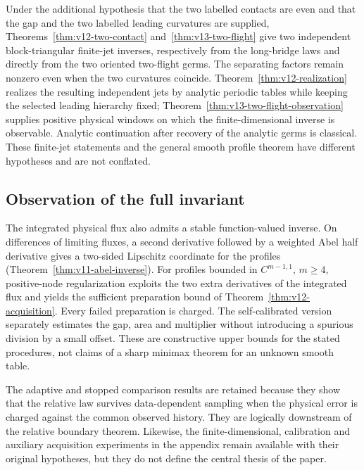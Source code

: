 Under the additional hypothesis that the two labelled contacts are
even and that the gap and the two labelled leading curvatures are supplied,
Theorems~\ref{thm:v12-two-contact} and~\ref{thm:v13-two-flight} give two
independent block-triangular finite-jet inverses, respectively from the
long-bridge laws and directly from the two oriented two-flight germs.  The
separating factors remain nonzero even when the two curvatures coincide.
Theorem~\ref{thm:v12-realization} realizes the resulting independent jets
by analytic periodic tables while keeping the selected leading hierarchy
fixed; Theorem~\ref{thm:v13-two-flight-observation} supplies positive
physical windows on which the finite-dimensional inverse is observable.
Analytic continuation after recovery of the analytic germs is classical.
These finite-jet statements and the general smooth profile theorem have
different hypotheses and are not conflated.

\subsection{Observation of the full invariant}
The integrated physical flux also admits a stable function-valued inverse.
On differences of limiting fluxes, a second derivative followed by a
weighted Abel half derivative gives a two-sided Lipschitz coordinate for
the profiles (Theorem~\ref{thm:v11-abel-inverse}).  For profiles bounded in
$C^{m-1,1}$, $m\ge4$, positive-node regularization exploits the two extra
derivatives of the integrated flux and yields the sufficient preparation
bound of Theorem~\ref{thm:v12-acquisition}.  Every failed preparation is
charged.  The self-calibrated version separately estimates the gap, area
and multiplier without introducing a spurious division by a small offset.
These are constructive upper bounds for the stated procedures, not claims
of a sharp minimax theorem for an unknown smooth table.

The adaptive and stopped comparison results are retained because they
show that the relative law survives data-dependent sampling when the
physical error is charged against the common observed history.  They are
logically downstream of the relative boundary theorem.  Likewise, the
finite-dimensional, calibration and auxiliary acquisition experiments in
the appendix remain available with their original hypotheses, but they do
not define the central thesis of the paper.

